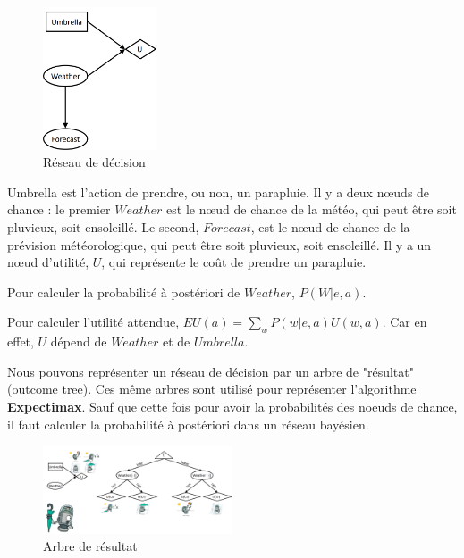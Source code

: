 \begin{example}\leavevmode
    \begin{figure}[H]
        \centering
        \includegraphics[width=0.3\textwidth]{../pictures/decisonnet.png}
        \caption{Réseau de décision}\label{fig:decisionnet}
    \end{figure}

    Umbrella est l'action de prendre, ou non, un parapluie. Il y a deux nœuds de chance : le premier $Weather$
    est le nœud de chance de la météo, qui peut être soit pluvieux, soit ensoleillé. 
    Le second, $Forecast$, est le nœud de chance de la prévision météorologique, qui peut être soit pluvieux, soit ensoleillé.
    Il y a un nœud d'utilité, $U$, qui représente le coût de prendre un parapluie.

    Pour calculer la probabilité à postériori de $Weather$, $P(W | e, a)$.

    Pour calculer l'utilité attendue, $EU(a) = \sum_{w} P(w | e, a) U(w, a)$. Car en effet,
    $U$ dépend de $Weather$ et de $Umbrella$.
\end{example}

Nous pouvons représenter un réseau de décision par un arbre de "résultat" (outcome tree). Ces même arbres 
sont utilisé pour représenter l'algorithme \textbf{Expectimax}.
Sauf que cette fois pour avoir la probabilités des noeuds de chance, il faut calculer la probabilité à postériori dans un réseau bayésien.

\begin{figure}[H]
    \begin{center}
        \includegraphics[width=0.5\textwidth]{../pictures/decisionnetasoutcometree.png}
    \end{center}
    \caption{Arbre de résultat}\label{fig:decisionnetasoutcometree}
\end{figure}

